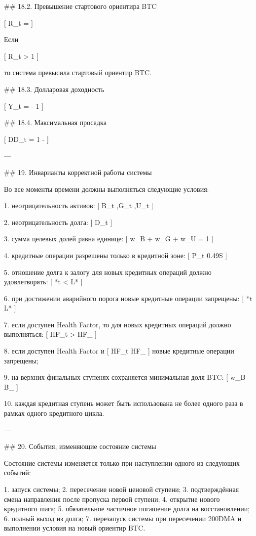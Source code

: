 ## 18.2. Превышение стартового ориентира BTC

[
R_t = 
]

Если

[
R_t > 1
]

то система превысила стартовый ориентир BTC.

## 18.3. Долларовая доходность

[
Y_t =  - 1
]

## 18.4. Максимальная просадка

[
DD_t = 1 - 
]

---

## 19. Инварианты корректной работы системы

Во все моменты времени должны выполняться следующие условия:

1. неотрицательность активов:
   [
   B_t ,\qquad G_t ,\qquad U_t 
   ]

2. неотрицательность долга:
   [
   D_t 
   ]

3. сумма целевых долей равна единице:
   [
   w_B + w_G + w_U = 1
   ]

4. кредитные операции разрешены только в кредитной зоне:
   [
   P_t \le 0.49S
   ]

5. отношение долга к залогу для новых кредитных операций должно удовлетворять:
   [
   *t < L*{}
   ]

6. при достижении аварийного порога новые кредитные операции запрещены:
   [
   *t \ge L*{}
   ]

7. если доступен Health Factor, то для новых кредитных операций должно выполняться:
   [
   HF_t > HF_{}
   ]

8. если доступен Health Factor и
   [
   HF_t \le HF_{}
   ]
   новые кредитные операции запрещены;

9. на верхних финальных ступенях сохраняется минимальная доля BTC:
   [
   w_B \ge B_{\min}
   ]

10. каждая кредитная ступень может быть использована не более одного раза в рамках одного кредитного цикла.

---

## 20. События, изменяющие состояние системы

Состояние системы изменяется только при наступлении одного из следующих событий:

1. запуск системы;
2. пересечение новой ценовой ступени;
3. подтверждённая смена направления после пропуска первой ступени;
4. открытие нового кредитного шага;
5. обязательное частичное погашение долга на восстановлении;
6. полный выход из долга;
7. перезапуск системы при пересечении 200DMA и выполнении условия на новый ориентир BTC.

